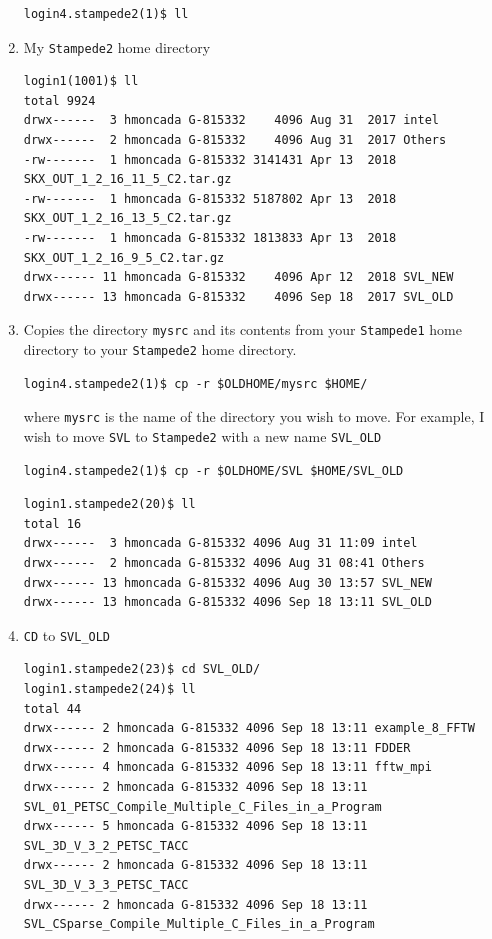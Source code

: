 \documentclass{article}
\begin{document}
\begin{enumerate}
\begin{verbatim}
login4.stampede2(1)$ ll
\end{verbatim}
\normalsize
\item My \verb+Stampede2+ home directory
\scriptsize
\begin{verbatim}
login1(1001)$ ll
total 9924
drwx------  3 hmoncada G-815332    4096 Aug 31  2017 intel
drwx------  2 hmoncada G-815332    4096 Aug 31  2017 Others
-rw-------  1 hmoncada G-815332 3141431 Apr 13  2018 SKX_OUT_1_2_16_11_5_C2.tar.gz
-rw-------  1 hmoncada G-815332 5187802 Apr 13  2018 SKX_OUT_1_2_16_13_5_C2.tar.gz
-rw-------  1 hmoncada G-815332 1813833 Apr 13  2018 SKX_OUT_1_2_16_9_5_C2.tar.gz
drwx------ 11 hmoncada G-815332    4096 Apr 12  2018 SVL_NEW
drwx------ 13 hmoncada G-815332    4096 Sep 18  2017 SVL_OLD
\end{verbatim}
\normalsize
\item Copies the directory \verb+mysrc+ and its contents from your \verb+Stampede1+ home directory to your \verb+Stampede2+ home directory.
\scriptsize
\begin{verbatim}
login4.stampede2(1)$ cp -r $OLDHOME/mysrc $HOME/
\end{verbatim}
\normalsize
where \verb+mysrc+ is the name of the directory you wish to move. For example, I wish to move \verb+SVL+ to \verb+Stampede2+ with a new name \verb+SVL_OLD+
\scriptsize
\begin{verbatim}
login4.stampede2(1)$ cp -r $OLDHOME/SVL $HOME/SVL_OLD
\end{verbatim}
\normalsize
\scriptsize
\begin{verbatim}
login1.stampede2(20)$ ll
total 16
drwx------  3 hmoncada G-815332 4096 Aug 31 11:09 intel
drwx------  2 hmoncada G-815332 4096 Aug 31 08:41 Others
drwx------ 13 hmoncada G-815332 4096 Aug 30 13:57 SVL_NEW
drwx------ 13 hmoncada G-815332 4096 Sep 18 13:11 SVL_OLD
\end{verbatim}
\normalsize
\item \verb+CD+ to \verb+SVL_OLD+
\scriptsize
\begin{verbatim}
login1.stampede2(23)$ cd SVL_OLD/
login1.stampede2(24)$ ll
total 44
drwx------ 2 hmoncada G-815332 4096 Sep 18 13:11 example_8_FFTW
drwx------ 2 hmoncada G-815332 4096 Sep 18 13:11 FDDER
drwx------ 4 hmoncada G-815332 4096 Sep 18 13:11 fftw_mpi
drwx------ 2 hmoncada G-815332 4096 Sep 18 13:11 SVL_01_PETSC_Compile_Multiple_C_Files_in_a_Program
drwx------ 5 hmoncada G-815332 4096 Sep 18 13:11 SVL_3D_V_3_2_PETSC_TACC
drwx------ 2 hmoncada G-815332 4096 Sep 18 13:11 SVL_3D_V_3_3_PETSC_TACC
drwx------ 2 hmoncada G-815332 4096 Sep 18 13:11 SVL_CSparse_Compile_Multiple_C_Files_in_a_Program

\end{verbatim}
\end{enumerate}
\end{document}
